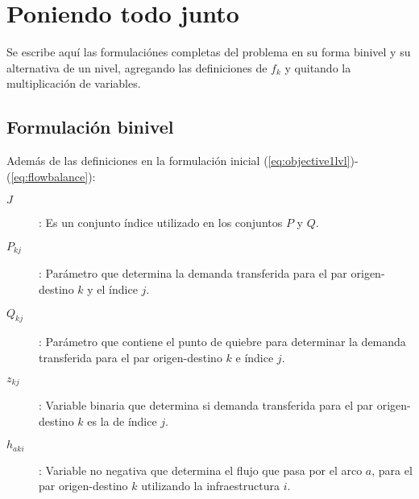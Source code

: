 \documentclass{article}
\begin{document}
  \section*{Poniendo todo junto}

  Se escribe aquí las formulaciónes completas del problema en su forma binivel y su alternativa de un nivel, agregando las definiciones de $f_k$ y quitando la multiplicación de variables.

  \subsection*{Formulación binivel}

  Además de las definiciones en la formulación inicial (\ref{eq:objective1lvl})-(\ref{eq:flowbalance}):

  \begin{description}
    \item[$J$]: Es un conjunto índice utilizado en los conjuntos $P$ y $Q$.
    \item[$P_{kj}$]: Parámetro que determina la demanda transferida para el par origen-destino $k$ y el índice $j$.
    \item[$Q_{kj}$]: Parámetro que contiene el punto de quiebre para determinar la demanda transferida para el par origen-destino $k$ e índice $j$. 
    \item[$z_{kj}$]: Variable binaria que determina si demanda transferida para el par origen-destino $k$ es la de índice $j$.
    \item[$h_{aki}$]: Variable no negativa que determina el flujo que pasa por el arco $a$, para el par origen-destino $k$ utilizando la infraestructura $i$. 
  \end{description}
\end{document}
